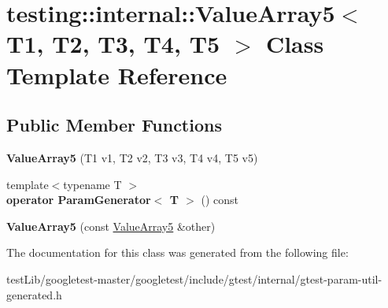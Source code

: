 \hypertarget{classtesting_1_1internal_1_1ValueArray5}{}\section{testing\+:\+:internal\+:\+:Value\+Array5$<$ T1, T2, T3, T4, T5 $>$ Class Template Reference}
\label{classtesting_1_1internal_1_1ValueArray5}
\subsection*{Public Member Functions}
\begin{DoxyCompactItemize}
\item 
\mbox{\label{classtesting_1_1internal_1_1ValueArray5_a9c5687fd18da21263aebc21b9ea508b8}} 
{\bfseries Value\+Array5} (T1 v1, T2 v2, T3 v3, T4 v4, T5 v5)
\item 
\mbox{\label{classtesting_1_1internal_1_1ValueArray5_ab925a168d89be9964c4319e5212222c1}} 
{\footnotesize template$<$typename T $>$ }\\{\bfseries operator Param\+Generator$<$ T $>$} () const
\item 
\mbox{\label{classtesting_1_1internal_1_1ValueArray5_a7de67e844073d0ec3c7c6e5736fb9ba6}} 
{\bfseries Value\+Array5} (const \hyperlink{classtesting_1_1internal_1_1ValueArray5}{Value\+Array5} \&other)
\end{DoxyCompactItemize}


The documentation for this class was generated from the following file\+:\begin{DoxyCompactItemize}
\item 
test\+Lib/googletest-\/master/googletest/include/gtest/internal/gtest-\/param-\/util-\/generated.\+h\end{DoxyCompactItemize}

